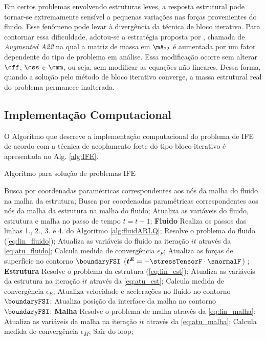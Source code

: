 Em certos problemas envolvendo estruturas leves, a resposta estrutural pode tornar-se extremamente sensível a pequenas variações nas forças provenientes do fluido. Esse fenômeno pode levar à divergência da técnica de bloco iterativo. Para contornar essa dificuldade, adotou-se a estratégia proposta por , chamada de \textit{Augmented A22} na qual a matriz de massa em $\mA_{22}$ é aumentada por um fator dependente do tipo de problema em análise. Essa modificação ocorre sem alterar $\cff$, $\css$ e $\cmm$, ou seja, sem modificar as equações não lineares. Dessa forma, quando a solução pelo método de bloco iterativo converge, a massa estrutural real do problema permanece inalterada.

\subsection{Implementação Computacional} 

O Algoritmo que descreve a implementação computacional do problema de IFE de acordo com a técnica de acoplamento forte do tipo bloco-iterativo é apresentada no Alg. \ref{alg:IFE}.

\begin{algorithm}
	\caption{Algoritmo para solução de problemas IFE}
	\label{alg:IFE}
	\begin{algorithmic}[1]
		\State Busca por coordenadas paramétricas correspondentes aos nós da malha do fluido na malha da estrutura;
		\State Busca por coordenadas paramétricas correspondentes aos nós da malha da estrutura na malha do fluido;
		\State Atualiza as variáveis do fluido, estrutura e malha no passo de tempo $t = t-1$;
		\State \textbf{Fluido}
		\State Realiza os passos das linhas 1., 2., 3. e 4. do Algoritmo \ref{alg:fluidARLQ};
		\State Resolve o problema do fluido (\autoref{eq:lin_fluido});
		\State Atualiza as variáveis do fluido na iteração $it$ através da \autoref{eq:atu_fluido};
		\State Calcula medida de convergência $\epsilon_F$;
		\State Atualiza as forças de superfície no contorno  $\boundaryFSI$ ($\boldsymbol{t^{E}} = -\stressTensorF \cdot \snormalF$) ;
		\State \textbf{Estrutura}
		\State Resolve o problema da estrutura (\autoref{eq:lin_est});
		\State Atualiza as variáveis da estrutura na iteração $it$ através da \autoref{eq:atu_est};
		\State Calcula medida de convergência $\epsilon_E$;
		\State Atualiza velocidade e acelerações no fluido no contorno  $\boundaryFSI$;
		\State Atualiza posição da interface da malha no contorno  $\boundaryFSI$;
		\State \textbf{Malha}
		\State Resolve o problema de malha através da \autoref{eq:lin_malha};
		\State Atualiza as variáveis da malha na iteração $it$ através da \autoref{eq:atu_malha};
		\State Calcula medida de convergência $\epsilon_M$;
		\State Sair do loop;
		\EndIf
		\EndFor
		\EndFor
	\end{algorithmic}
\end{algorithm}

